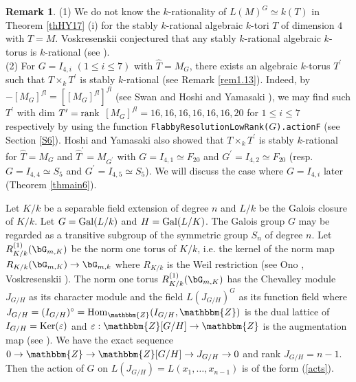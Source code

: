 \documentclass{amsart}
\theoremstyle{plain}
\theoremstyle{definition}
\newtheorem{remark}[theorem]{Remark}
\theoremstyle{remark}
\newcommand{\bZ}{\mathbbm{Z}}\newcommand{\bQ}{\mathbbm{Q}}
\newcounter{sub}\def\tr{\mbox{tr }}
\begin{document}
\begin{remark}\label{rem1.19}
(1) We do not know the $k$-rationality of 
$L(M)^G\simeq k(T)$ in Theorem \ref{thHY17} (i) 
for the stably $k$-rational algebraic $k$-tori $T$ 
of dimension $4$ with $\widehat{T}=M$. 
Voskresenskii conjectured that any stably $k$-rational 
algebraic $k$-torus 
is $k$-rational (see \cite[Section 6.2]{Vos98}).\\
(2) 
For $G=I_{4,i}$ $(1\leq i\leq 7)$ with $\widehat{T}=M_G$, 
there exists an algebraic $k$-torus $T^\prime$ such that 
$T\times_k T^\prime$ is stably $k$-rational (see Remark \ref{rem1.13}). 
Indeed, by $-[M_G]^{fl}=[[M_G]^{fl}]^{fl}$ (see Swan \cite[Lemma 3.1]{Swa10} 
and Hoshi and Yamasaki \cite[Lemma 2.15]{HY17}), 
we may find such $T^\prime$ with dim $T^\prime={\rm rank}$ 
$[M_G]^{fl}=16,16,16,16,16,16,20$ 
for $1\leq i\leq 7$ respectively 
by using the function 
{\tt FlabbyResolutionLowRank(}$G${\tt ).actionF} 
(see Section \ref{S6}). 
Hoshi and Yamasaki \cite[Theorem 1.27]{HY17} also showed that 
$T\times_k T^\prime$ is stably $k$-rational for $\widehat{T}=M_G$ 
and $\widehat{T}^\prime=M_{G^\prime}$ with 
$G=I_{4,1}\simeq F_{20}$ and $G^\prime=I_{4,2}\simeq F_{20}$ 
(resp. 
$G=I_{4,4}\simeq S_5$ and $G^\prime=I_{4,5}\simeq S_5$). 
We will discuss the case where $G=I_{4,i}$ later (Theorem \ref{thmain6}).
\end{remark}
%

Let $K/k$ be a separable field extension of degree $n$ 
and $L/k$ be the Galois closure of $K/k$. 
Let $G={\rm Gal}(L/k)$ and $H={\rm Gal}(L/K)$. 
The Galois group $G$ may be regarded as a transitive subgroup of 
the symmetric group $S_n$ of degree $n$. 
Let $R^{(1)}_{K/k}(\bG_{m,K})$ be the norm one torus of $K/k$,
i.e. the kernel of the norm map $R_{K/k}(\bG_{m,K})\rightarrow \bG_{m,k}$ 
where 
$R_{K/k}$ is the Weil restriction (see Ono \cite[Section 1.4]{Ono61}, 
Voskresenskii \cite[page 37, Section 3.12]{Vos98}). 
The norm one torus $R^{(1)}_{K/k}(\bG_{m,K})$ has the 
Chevalley module $J_{G/H}$ as its character module 
and the field $L(J_{G/H})^G$ as its function field 
where $J_{G/H}=(I_{G/H})^\circ={\rm Hom}_\bZ(I_{G/H},\bZ)$ 
is the dual lattice of $I_{G/H}={\rm Ker}(\varepsilon)$ and 
$\varepsilon : \bZ[G/H]\rightarrow \bZ$ is the augmentation map 
(see \cite[Section 4.8]{Vos98}). 
We have the exact sequence $0\rightarrow \bZ\rightarrow \bZ[G/H]
\rightarrow J_{G/H}\rightarrow 0$ and rank $J_{G/H}=n-1$. 
Then the action of $G$ on $L(J_{G/H})=L(x_1,\ldots,x_{n-1})$ is 
of the form (\ref{acts}). 
\end{document}
